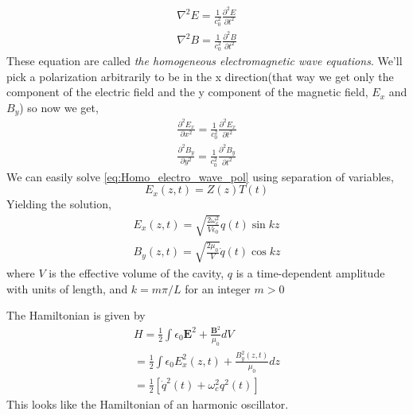 \documentclass{article}
\numberwithin{equation}{section}
\begin{document}
\begin{equation} \label{eq:Homo_electro_wave}
    \begin{split}
        \nabla^2 E = \frac{1}{c_0^2}\frac{\partial^2 E}{\partial t^2} \\
        \nabla^2 B = \frac{1}{c_0^2}\frac{\partial^2 B}{\partial t^2}
    \end{split}
\end{equation}
These equation are called \textit{the homogeneous electromagnetic wave equations}.
We'll pick a polarization arbitrarily to be in the x direction(that way we get only the component of the electric field and the y component of the magnetic field, $E_x$ and $B_y$) so now we get,
\begin{equation} \label{eq:Homo_electro_wave_pol}
    \begin{split}
        \frac{\partial^2 E_x}{\partial x^2} = \frac{1}{c_0^2}\frac{\partial^2 E_x}{\partial t^2} \\
        \frac{\partial^2 B_y}{\partial y^2} = \frac{1}{c_0^2}\frac{\partial^2 B_y}{\partial t^2}
    \end{split}
\end{equation}
We can easily solve \ref{eq:Homo_electro_wave_pol} using separation of variables,
$$E_x(z, t)= Z(z)T(t)$$
Yielding the solution,
\begin{equation}
    \begin{split}
        E_x(z, t) = \sqrt{\frac{2 \omega_c^2}{V \epsilon_0}}q(t)\sin{kz} \\
        B_y(z, t) = \sqrt{\frac{2 \mu_0}{V}}\dot{q}(t)\cos{kz}
    \end{split}
\end{equation}
where $V$ is the effective volume of the cavity, $q$ is a time-dependent amplitude with units of length, and $k = m\pi/L$ for
an integer $m > 0$

The Hamiltonian is given by
\begin{equation}
    \begin{split}
        H = \frac{1}{2}\int\epsilon_0 \textbf{E}^2 + \frac{\textbf{B}^2}{\mu_0} dV \\
        = \frac{1}{2}\int\epsilon_0 E_x^2(z, t) + \frac{B_y^2(z, t)}{\mu_0} dz \\
        = \frac{1}{2}[\dot{q}^2(t) + \omega_c^2 q^2(t)]
    \end{split}
\end{equation}
This looks like the Hamiltonian of an harmonic oscillator.
\end{document}
